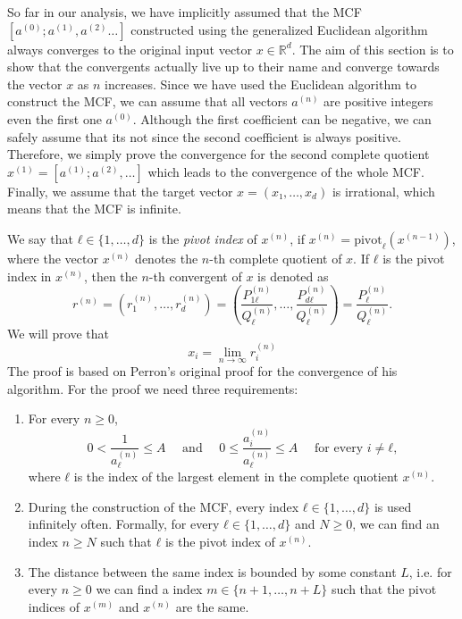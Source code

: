 So far in our analysis, we have implicitly assumed that the MCF $[a^{(0)}; a^{(1)}, a^{(2)} …]$
constructed using the generalized Euclidean algorithm always converges to the
original input vector $x ∈ ℝ^d$.
The aim of this section is to show that the convergents actually live up to
their name and converge towards the vector $x$ as $n$ increases.
Since we have used the Euclidean algorithm to construct the MCF,
we can assume that all vectors $a^{(n)}$ are positive integers even the first
one $a^{(0)}$.
Although the first coefficient can be negative, we can safely assume that its
not since the second coefficient is always positive.
Therefore, we simply prove the convergence for the second complete quotient $x^{(1)} =
[a^{(1)}; a^{(2)}, …]$ which leads to the convergence of the whole MCF.
Finally, we assume that the target vector $x = (x₁, …, x_d)$ is irrational,
which means that the MCF is infinite.

We say that $ℓ ∈ \{1, …, d\}$ is the \emph{pivot index} of $x^{(n)}$,
if $x^{(n)} = \mathrm{pivot}_ℓ(x^{(n-1)})$,
where the vector $x^{(n)}$ denotes the $n$-th complete quotient of $x$.
If $ℓ$ is the pivot index in $x^{(n)}$,
then the $n$-th convergent of $x$ is denoted as
\[
  r^{(n)}
  = (r_1^{(n)}, …, r_d^{(n)})
  = \left( \frac{P_{1ℓ}^{(n)}}{Q_ℓ^{(n)}}, \dots, \frac{P_{dℓ}^{(n)}}{Q_ℓ^{(n)}} \right)
  = \frac{P_ℓ^{(n)}}{Q_ℓ^{(n)}}.
\]
We will prove that
\[
  x_i = \lim_{n → ∞} r_i^{(n)}
\]
The proof is based on Perron's original proof \cite{Perron07} for the
convergence of his algorithm.
For the proof we need three requirements:
\begin{enumerate}
  \item
    For every $n ≥ 0$,
    \[
      0 < \frac{1}{a_ℓ^{(n)}} ≤ A
      \quad \text{ and } \quad
      0 ≤ \frac{a_i^{(n)}}{a_ℓ^{(n)}} ≤ A \quad \text{ for every } i ≠ ℓ,
    \]
    where $ℓ$ is the index of the largest element in the complete quotient $x^{(n)}$.
  \item
    During the construction of the MCF,
    every index $ℓ ∈ \{1, …, d\}$ is used infinitely often.
    Formally, for every $ℓ ∈ \{1, …, d\}$ and $N ≥ 0$,
    we can find an index $n ≥ N$ such that $ℓ$ is the pivot index of $x^{(n)}$.
  \item
    The distance between the same index is bounded by some constant $L$,
    i.e. for every $n ≥ 0$ we can find a index $m ∈ \{n+1, …, n+L\}$ such that
    the pivot indices of $x^{(m)}$ and $x^{(n)}$ are the same.
\end{enumerate}

